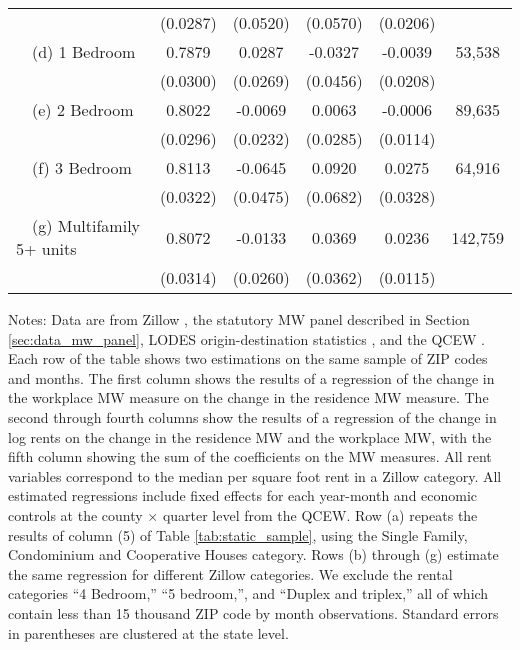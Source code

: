 \begin{landscape}
\begin{table}[ht!]
\begin{tabular}{@{}lccccc@{}}
                                                 & (0.0287) & (0.0520) & (0.0570) & (0.0206) &      \\
        $\quad$(d) 1 Bedroom                     &  0.7879  &  0.0287  &  -0.0327  &  -0.0039  & 53,538 \\
                                                 & (0.0300) & (0.0269) & (0.0456) & (0.0208) &      \\
        $\quad$(e) 2 Bedroom                     &  0.8022  &  -0.0069  &  0.0063  &  -0.0006  & 89,635 \\
                                                 & (0.0296) & (0.0232) & (0.0285) & (0.0114) &      \\
        $\quad$(f) 3 Bedroom                     &  0.8113  &  -0.0645  &  0.0920  &  0.0275  & 64,916 \\
                                                 & (0.0322) & (0.0475) & (0.0682) & (0.0328) &      \\
        $\quad$(g) Multifamily 5+ units          &  0.8072  &  -0.0133  &  0.0369  &  0.0236  & 142,759 \\
                                                 & (0.0314) & (0.0260) & (0.0362) & (0.0115) &      \\ \bottomrule
    \end{tabular}

    \begin{minipage}{.95\linewidth} \footnotesize
        \vspace{2mm}
        Notes:
        Data are from Zillow \parencite{ZillowData}, 
        the statutory MW panel described in Section \ref{sec:data_mw_panel}, 
        LODES origin-destination statistics \parencite{CensusLODES},
        and the QCEW \parencite{QCEW}.
        Each row of the table shows two estimations on the same sample of ZIP 
        codes and months.
        The first column shows the results of a regression of the change in the 
        workplace MW measure on the change in the residence MW measure.
        The second through fourth columns show the results of a regression of 
        the change in log rents on the change in the residence MW and the 
        workplace MW, with the fifth column showing the sum of the coefficients 
        on the MW measures.
        All rent variables correspond to the median per square foot rent in a 
        Zillow category.
        All estimated regressions include fixed effects for each year-month and 
        economic controls at the county $\times$ quarter level from the QCEW.
        Row (a) repeats the results of column (5) of Table \ref{tab:static_sample}, 
        using the Single Family, Condominium and Cooperative Houses category.
        Rows (b) through (g) estimate the same regression for different Zillow 
        categories.
        We exclude the rental categories ``4 Bedroom,'' ``5 bedroom,'', and 
        ``Duplex and triplex,'' all of which contain less than 15 thousand
        ZIP code by month observations.
        Standard errors in parentheses are clustered at the state level.
    \end{minipage}
\end{table}
\end{landscape}
